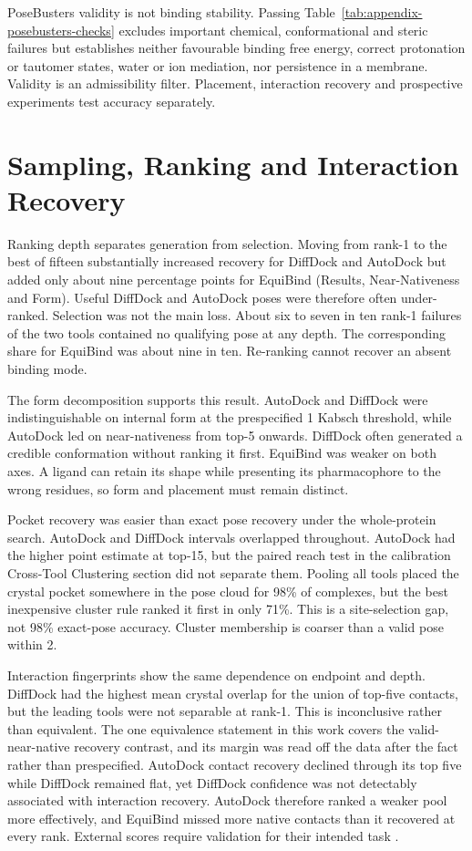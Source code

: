 PoseBusters validity is not binding stability. Passing Table~\ref{tab:appendix-posebusters-checks} excludes important chemical, conformational and steric failures but establishes neither favourable binding free energy, correct protonation or tautomer states, water or ion mediation, nor persistence in a membrane. Validity is an admissibility filter. Placement, interaction recovery and prospective experiments test accuracy separately.

\hypertarget{sampling-ranking-and-interaction-recovery}{%
\section{Sampling, Ranking and Interaction Recovery}\label{sampling-ranking-and-interaction-recovery}}

Ranking depth separates generation from selection. Moving from rank-1 to the best of fifteen substantially increased recovery for DiffDock and AutoDock but added only about nine percentage points for EquiBind (Results, Near-Nativeness and Form). Useful DiffDock and AutoDock poses were therefore often under-ranked. Selection was not the main loss. About six to seven in ten rank-1 failures of the two tools contained no qualifying pose at any depth. The corresponding share for EquiBind was about nine in ten. Re-ranking cannot recover an absent binding mode.

The form decomposition supports this result. AutoDock and DiffDock were indistinguishable on internal form at the prespecified 1\angstrom{} Kabsch threshold, while AutoDock led on near-nativeness from top-5 onwards. DiffDock often generated a credible conformation without ranking it first. EquiBind was weaker on both axes. A ligand can retain its shape while presenting its pharmacophore to the wrong residues, so form and placement must remain distinct.

Pocket recovery was easier than exact pose recovery under the whole-protein search. AutoDock and DiffDock intervals overlapped throughout. AutoDock had the higher point estimate at top-15, but the paired reach test in the calibration Cross-Tool Clustering section did not separate them. Pooling all tools placed the crystal pocket somewhere in the pose cloud for 98\% of complexes, but the best inexpensive cluster rule ranked it first in only 71\%. This is a site-selection gap, not 98\% exact-pose accuracy. Cluster membership is coarser than a valid pose within 2\angstrom{}.

Interaction fingerprints show the same dependence on endpoint and depth. DiffDock had the highest mean crystal overlap for the union of top-five contacts, but the leading tools were not separable at rank-1. This is inconclusive rather than equivalent. The one equivalence statement in this work covers the valid-near-native recovery contrast, and its margin was read off the data after the fact rather than prespecified. AutoDock contact recovery declined through its top five while DiffDock remained flat, yet DiffDock confidence was not detectably associated with interaction recovery. AutoDock therefore ranked a weaker pool more effectively, and EquiBind missed more native contacts than it recovered at every rank. External scores require validation for their intended task \cite{ref067}.

